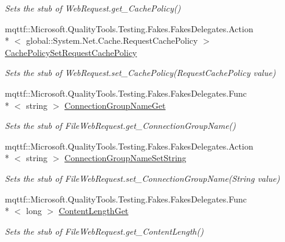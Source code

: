 \begin{DoxyCompactItemize}
\begin{DoxyCompactList}\small\item\em Sets the stub of Web\-Request.\-get\-\_\-\-Cache\-Policy()\end{DoxyCompactList}\item 
mqttf\-::\-Microsoft.\-Quality\-Tools.\-Testing.\-Fakes.\-Fakes\-Delegates.\-Action\\*
$<$ global\-::\-System.\-Net.\-Cache.\-Request\-Cache\-Policy $>$ \hyperlink{class_system_1_1_net_1_1_fakes_1_1_stub_file_web_request_a9b73ba9bd8b7349ae5c9b6f12e0d7a18}{Cache\-Policy\-Set\-Request\-Cache\-Policy}
\begin{DoxyCompactList}\small\item\em Sets the stub of Web\-Request.\-set\-\_\-\-Cache\-Policy(\-Request\-Cache\-Policy value)\end{DoxyCompactList}\item 
mqttf\-::\-Microsoft.\-Quality\-Tools.\-Testing.\-Fakes.\-Fakes\-Delegates.\-Func\\*
$<$ string $>$ \hyperlink{class_system_1_1_net_1_1_fakes_1_1_stub_file_web_request_ae9fa354178edc0be0100d808f5b677f1}{Connection\-Group\-Name\-Get}
\begin{DoxyCompactList}\small\item\em Sets the stub of File\-Web\-Request.\-get\-\_\-\-Connection\-Group\-Name()\end{DoxyCompactList}\item 
mqttf\-::\-Microsoft.\-Quality\-Tools.\-Testing.\-Fakes.\-Fakes\-Delegates.\-Action\\*
$<$ string $>$ \hyperlink{class_system_1_1_net_1_1_fakes_1_1_stub_file_web_request_a813fafae14d2b2c25bed3d49dc872021}{Connection\-Group\-Name\-Set\-String}
\begin{DoxyCompactList}\small\item\em Sets the stub of File\-Web\-Request.\-set\-\_\-\-Connection\-Group\-Name(\-String value)\end{DoxyCompactList}\item 
mqttf\-::\-Microsoft.\-Quality\-Tools.\-Testing.\-Fakes.\-Fakes\-Delegates.\-Func\\*
$<$ long $>$ \hyperlink{class_system_1_1_net_1_1_fakes_1_1_stub_file_web_request_aa726c198d45740251fbede503cd5ec28}{Content\-Length\-Get}
\begin{DoxyCompactList}\small\item\em Sets the stub of File\-Web\-Request.\-get\-\_\-\-Content\-Length()\end{DoxyCompactList}\item 

\end{DoxyCompactItemize}
